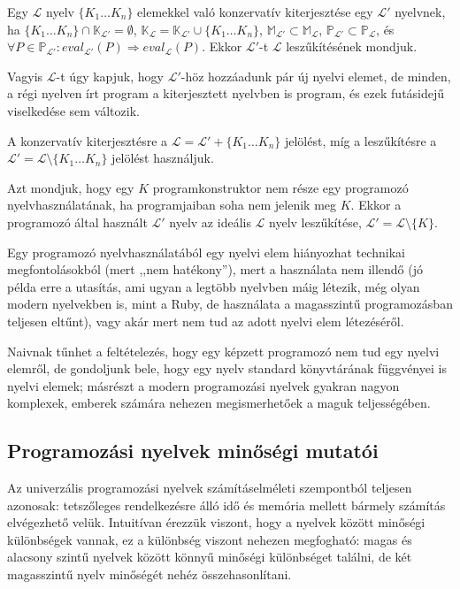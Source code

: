 \begin{defn}\label{defn:conservative_extension}
	Egy $\mathcal{L}$ nyelv $\{K_1 \ldots K_n\}$ elemekkel való konzervatív kiterjesztése egy $\mathcal{L}'$ nyelvnek, ha
	$ \{K_1 \ldots K_n\} \cap \mathbb{K}_{\mathcal{L}'} = \emptyset$,
	$\mathbb{K}_\mathcal{L} = \mathbb{K}_{\mathcal{L}'} \cup \{K_1 \ldots K_n\}$,
	$\mathbb{M}_{\mathcal{L}'} \subset \mathbb{M}_\mathcal{L}$, $\mathbb{P}_{\mathcal{L}'} \subset \mathbb{P}_\mathcal{L}$, és $ \forall P \in \mathbb{P}_{\mathcal{L}'}: eval_{\mathcal{L}'}(P) \Rightarrow eval_\mathcal{L}(P)$. Ekkor $\mathcal{L}'$-t $\mathcal{L}$ leszűkítésének mondjuk.

	\normalfont Vagyis $\mathcal{L}$-t úgy kapjuk, hogy $\mathcal{L}'$-höz hozzáadunk pár új nyelvi elemet, de minden, a régi nyelven írt program a kiterjesztett nyelvben is program, és ezek futásidejű viselkedése sem változik.

	\normalfont A konzervatív kiterjesztésre a $\mathcal{L} = \mathcal{L}' + \{K_1 \ldots K_n\}$ jelölést, míg a leszűkítésre a $\mathcal{L}' = \mathcal{L} \setminus \{K_1 \ldots K_n\}$ jelölést használjuk.
\end{defn}


\begin{defn}[Nyelvhasználat]
Azt mondjuk, hogy egy $K$ programkonstruktor nem része egy programozó nyelvhasználatának, ha programjaiban soha nem jelenik meg $K$.
Ekkor a programozó által használt $\mathcal{L}'$ nyelv az ideális $\mathcal{L}$ nyelv leszűkítése, $\mathcal{L}' = \mathcal{L} \setminus \{K\}$.

\normalfont Egy programozó nyelvhasználatából egy nyelvi elem hiányozhat technikai megfontolásokból (mert ,,nem hatékony''), mert a használata nem illendő (jó példa erre a  utasítás, ami ugyan a legtöbb nyelvben máig létezik, még olyan modern nyelvekben is, mint a Ruby, de használata a magasszintű programozásban teljesen eltűnt), vagy akár mert nem tud az adott nyelvi elem létezéséről.

Naivnak tűnhet a feltételezés, hogy egy képzett programozó nem tud egy nyelvi elemről, de gondoljunk bele, hogy egy nyelv standard könyvtárának függvényei is nyelvi elemek; másrészt a modern programozási nyelvek gyakran nagyon komplexek, emberek számára nehezen megismerhetőek a maguk teljességében.
\end{defn}


\subsection{Programozási nyelvek minőségi mutatói}
Az univerzális programozási nyelvek számításelméleti szempontból teljesen azonosak: tetszőleges rendelkezésre álló idő és memória mellett bármely számítás elvégezhető velük.
Intuitívan érezzük viszont, hogy a nyelvek között minőségi különbségek vannak, ez a különbség viszont nehezen megfogható: magas és alacsony szintű nyelvek között könnyű minőségi különbséget találni, de két magasszintű nyelv minőségét nehéz összehasonlítani.


